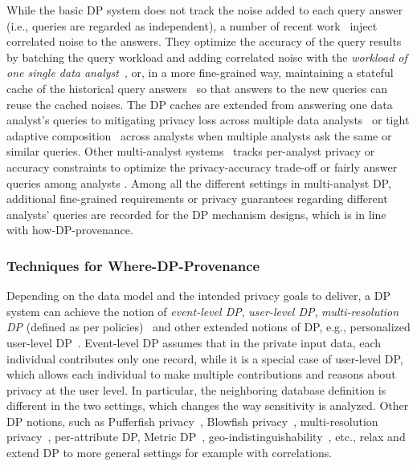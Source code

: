 While the basic DP system does not track the noise added to each query answer (i.e., queries are regarded as independent), a number of recent work~\cite{dprovdb,mazmudar2022cache,xiao2022answering,li2014data,hardt2010multiplicative,KostopoulouTCGL23turbo} inject correlated noise to the answers.
They optimize the accuracy of the query results by batching the query workload and adding correlated noise with the \emph{workload of one single data analyst}~\cite{xiao2021optimizing,li2014data,dong23composition}, or, in a more fine-grained way, maintaining a stateful cache of the historical query answers~\cite{mazmudar2022cache,KostopoulouTCGL23turbo,kotsogiannis2019privatesql} so that answers to the new queries can reuse the cached noises.
The DP caches are extended from answering one data analyst's queries to mitigating privacy loss across multiple data analysts~\cite{dprovdb,DworkNV12power_of_state,nicolas2023cohere,HsuRU13equilibrium} or tight adaptive composition~\cite{vadhan2021concurrent,vadhan2023concurrent} across analysts when multiple analysts ask the same or similar queries.
Other multi-analyst systems~\cite{xiao2021optimizing,xiao2022answering,knopf2021framework,pujol2021budget,pujol2022multi} tracks per-analyst privacy \cite{xiao2021optimizing} or accuracy \cite{knopf2021framework} constraints to optimize the privacy-accuracy trade-off or fairly answer queries among analysts \cite{pujol2021budget,pujol2022multi}.
Among all the different settings in multi-analyst DP, additional fine-grained requirements or privacy guarantees regarding different analysts' queries are recorded for the DP mechanism designs, which is in line with how-DP-provenance.



\subsubsection{Techniques for Where-DP-Provenance}

Depending on the data model and the intended privacy goals to deliver, a DP system can achieve the notion of \textit{event-level DP}, \textit{user-level DP}, \emph{multi-resolution DP} (defined as per policies)~\cite{he2014blowfish,kotsogiannis2019privatesql} and other extended notions of DP, e.g., personalized user-level DP~\cite{jorgensen2015personalized}.
Event-level DP assumes that in the private input data, each individual contributes only one record, while it is a special case of user-level DP, which allows each individual to make multiple contributions and reasons about privacy at the user level.
In particular, the neighboring database definition is different in the two settings, which changes the way sensitivity is analyzed.
Other DP notions, such as Pufferfish privacy~\cite{kifer2014pufferfish}, Blowfish privacy~\cite{he2014blowfish}, multi-resolution privacy~\cite{kotsogiannis2019privatesql}, per-attribute DP\cite{Ghazi0M023per_attr_DP}, Metric DP~\cite{chatzikokolakis2013broadening}, geo-indistinguishability~\cite{yu2022thwarting}, etc., relax and extend DP to more general settings for example with correlations.


